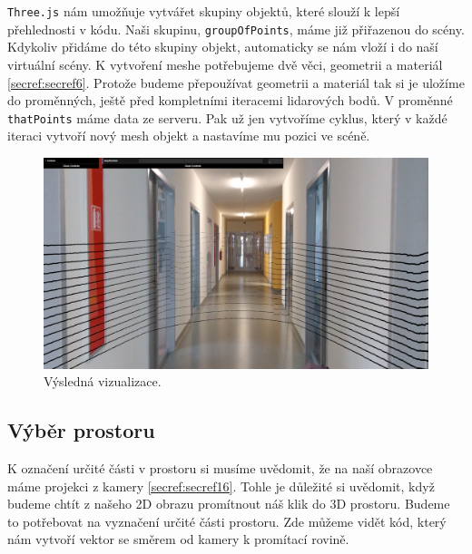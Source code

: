 \documentclass[czech,bachelor,dept420,male,cpdeclaration]{diploma}
\begin{document}


\texttt{Three.js} nám umožňuje vytvářet skupiny objektů, které slouží k lepší přehlednosti v kódu. Naši skupinu, \texttt{groupOfPoints}, máme již přiřazenou do scény. Kdykoliv přidáme do této skupiny objekt, automaticky se nám vloží i do naší virtuální scény. K vytvoření meshe potřebujeme dvě věci, geometrii a materiál \ref{secref:secref6}. Protože budeme přepoužívat geometrii a materiál tak si je uložíme do proměnných, ještě před kompletními iteracemi lidarových bodů. V proměnné \texttt{thatPoints} máme data ze serveru. Pak už jen vytvoříme cyklus, který v každé iteraci vytvoří nový mesh objekt a nastavíme mu pozici ve scéně.

\begin{figure}[H]
\includegraphics[width=\linewidth]{Figures/sceneWithPoints.png}
\caption{Výsledná vizualizace.}
\label{fig:sceneWithPoints}
\end{figure}
	 

\subsection{Výběr prostoru}\label{secref:secref10}
K označení určité části v prostoru si musíme uvědomit, že na naší obrazovce máme projekci z kamery \ref{secref:secref16}. Tohle je důležité si uvědomit, když budeme chtít z našeho 2D obrazu promítnout náš klik do 3D prostoru. Budeme to potřebovat na vyznačení určité části prostoru. Zde můžeme vidět kód, který nám vytvoří vektor se směrem od kamery k promítací rovině.  


\end{document}
